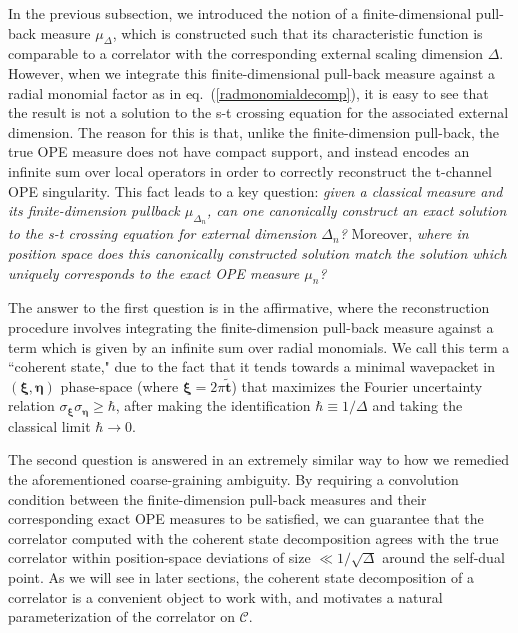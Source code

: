 \documentclass[a4paper,11pt]{article}
\theoremstyle{plain}
\theoremstyle{definition}
\theoremstyle{remark}
\newcommand{\bs}[1]{\boldsymbol{#1}}
\newcommand{\De}{\Delta}
\begin{document}
In the previous subsection, we introduced the notion of a finite-dimensional pull-back measure $\mu_{\De}$, which is constructed such that its characteristic function is comparable to a correlator with the corresponding external scaling dimension $\De$. However, when we integrate this finite-dimensional pull-back measure against a radial monomial factor as in eq.~(\ref{radmonomialdecomp}), it is easy to see that the result is not a solution to the s-t crossing equation for the associated external dimension. The reason for this is that, unlike the finite-dimension pull-back, the true OPE measure does not have compact support, and instead encodes an infinite sum over local operators in order to correctly reconstruct the t-channel OPE singularity. This fact leads to a key question: \textit{given a classical measure and its finite-dimension pullback $\mu_{\De_n}$, can one canonically construct an exact solution to the s-t crossing equation for external dimension $\De_n$?} Moreover, \textit{where in position space does this canonically constructed solution match the solution which uniquely corresponds to the exact OPE measure $\mu_n$? }

The answer to the first question is in the affirmative, where the reconstruction procedure involves integrating the finite-dimension pull-back measure against a term which is given by an infinite sum over radial monomials. We call this term a ``coherent state," due to the fact that it tends towards a minimal wavepacket in $(\bs{\xi},\bs{\eta})$ phase-space (where $\bs{\xi} = 2\pi\tilde{\bs{t}}$) that maximizes the Fourier uncertainty relation $\sigma_{\bs{\xi}}\sigma_{\bs{\eta}} \geq \hbar$, after making the identification $\hbar \equiv 1/ \De$ and taking the classical limit $\hbar\to0$. 

The second question is answered in an extremely similar way to how we remedied the aforementioned coarse-graining ambiguity. By requiring a convolution condition between the finite-dimension pull-back measures and their corresponding exact OPE measures to be satisfied, we can guarantee that the correlator computed with the coherent state decomposition agrees with the true correlator within position-space deviations of size $\ll 1/\sqrt{\De}$ around the self-dual point. As we will see in later sections, the coherent state decomposition of a correlator is a convenient object to work with, and motivates a natural parameterization of the correlator on $\mathscr{C}$. 
\end{document}
